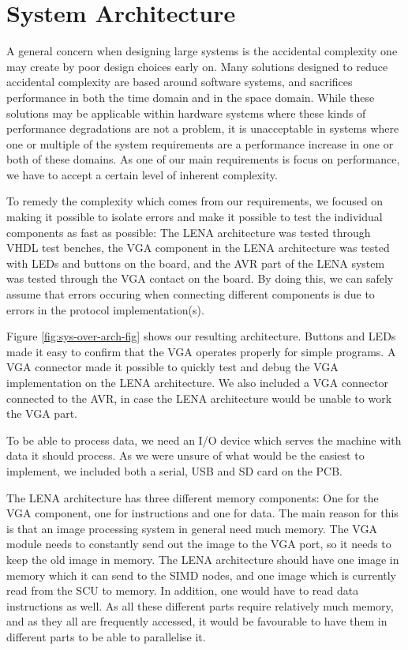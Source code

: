 \section{System Architecture}



A general concern when designing large systems is the accidental
complexity\cite[p.~8-9]{holt2004uml} one may create by poor design choices early
on. Many solutions designed to reduce accidental complexity are based around
software systems, and sacrifices performance in both the time domain and in the
space domain\cite{moseley2006out}. While these solutions may be applicable
within hardware systems where these kinds of performance degradations are not a
problem, it is unacceptable in systems where one or multiple of the system
requirements are a performance increase in one or both of these domains. As one
of our main requirements is focus on performance, we have to accept a certain
level of inherent complexity.

To remedy the complexity which comes from our requirements, we focused on making
it possible to isolate errors and make it possible to test the individual
components as fast as possible: The LENA architecture was tested through VHDL
test benches, the VGA component in the LENA architecture was tested with LEDs
and buttons on the board, and the AVR part of the LENA system was tested through
the VGA contact on the board. By doing this, we can safely assume that errors
occuring when connecting different components is due to errors in the protocol
implementation(s).

Figure \ref{fig:sys-over-arch-fig} shows our resulting architecture. Buttons and
LEDs made it easy to confirm that the VGA operates properly for simple
programs. A VGA connector made it possible to quickly test and debug the VGA
implementation on the LENA architecture. We also included a VGA connector
connected to the AVR, in case the LENA architecture would be unable to work the
VGA part.

To be able to process data, we need an I/O device which serves the machine with
data it should process. As we were unsure of what would be the easiest to
implement, we included both a serial, USB and SD card on the PCB.

The LENA architecture has three different memory components: One for the VGA
component, one for instructions and one for data. The main reason for this is
that an image processing system in general need much memory. The VGA module
needs to constantly send out the image to the VGA port, so it needs to keep the
old image in memory. The LENA architecture should have one image in memory which
it can send to the SIMD nodes, and one image which is currently read from the
SCU to memory. In addition, one would have to read data instructions as well. As
all these different parts require relatively much memory, and as they all are
frequently accessed, it would be favourable to have them in different parts to
be able to parallelise it.

